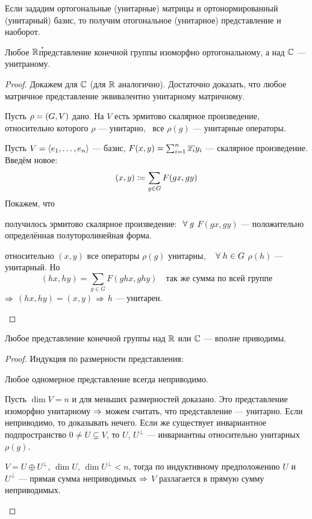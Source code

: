 Если зададим ортогональные (унитарные) матрицы и ортонормированный (унитарный) базис,
то получим отогональное (унитарное) представление и наоборот.

\begin{theorem}
	Любое $\mathbb{R}$\h представление конечной группы изоморфно ортогональному,
	а над $\mathbb{C}$ --- унитраному.
\end{theorem}
\begin{proof}
Докажем для $\mathbb{C}$ (для $\mathbb{R}$ аналогично).
Достаточно доказать, что любое матричное представление
эквивалентно унитарному матричному.

Пусть $\rho = \left(G, V\right)$ дано.
На $V$ есть эрмитово скалярное произведение,
относительно которого $\rho$ --- унитарно, \ie\
все $\rho(g)$ --- унитарные операторы.

Пусть $V = \left\langle e_1 ,\ldots, e_n\right\rangle$ --- базис,
$F(x, y) = \sum_{i = 1}^n \overline{x_i}y_i$ --- скалярное произведение.
Введём новое:
$$
	(x, y) \coloneqq \sum_{g\in G} F(gx, gy)
$$
Покажем, что
\begin{points}{-3}
	\item получилось эрмитово скалярное произведение:
		$~\forall\; g$ $F(gx, gy)$ --- положительно определённая полуторолинейная форма.
	\item относительно $(x, y)$ все операторы $\rho(g)$ унитарны, \ie\
		$~\forall\; h \in G$ $\rho(h)$ --- унитарный. Но
		$$
			(hx, hy) = \sum_{g \in G} F(ghx, ghy) \quad \text{так же сумма по всей группе}
		$$
		$\Rightarrow$ $(hx, hy) = (x, y)$ $\Rightarrow$ $h$ --- унитарен.
\end{points}
\end{proof}
\begin{imp}
	Любое представление конечной группы над $\mathbb{R}$ или $\mathbb{C}$ --- вполне приводимы.
\end{imp}
\begin{proof}
	Индукция по размерности представления:
	\begin{points}{-3}
		\item Любое одномерное представление всегда неприводимо.
		\item Пусть $\dim V = n$ и для меньших размерностей доказано.
			Это представление изоморфно унитарному $\Rightarrow$
			можем считать, что представление --- унитарно.
			Если неприводимо, то доказывать нечего.
			Если же существует инвариантное подпространство $0 \ne U \subsetneq V$,
			то $U$, $U^\perp$ --- инвариантны относительно унитарных $\rho(g)$.

			$V = U \oplus U^\perp$, $\dim U, \, \dim U^\perp < n$,
			тогда по индуктивному предположению $U$ и $U^\perp$ --- прямая сумма неприводимых
			$\Rightarrow$ $V$ разлагается в прямую сумму неприводимых.
	\end{points}
\end{proof}


